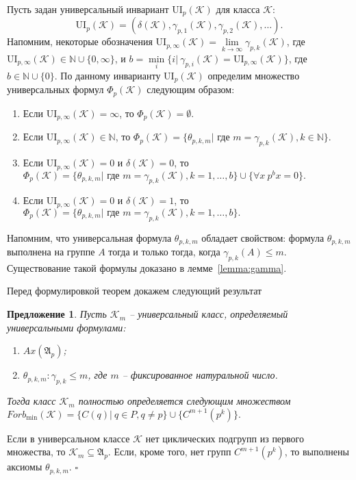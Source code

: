 \documentclass[a4paper,11pt,twoside]{article}
\newtheorem{proposition}{Предложение}[section]
\def\proof{{\noindent{\bf Доказательство.}} }
\def\A{{\mathfrak{A}}}
\def\K{{\mathcal{K}}}
\def\N{{\mathbb{N}}}
\def\ui{{\mathrm{UI}}}
\begin{document}
Пусть задан универсальный инвариант $\ui_p(\K)$ для класса $\K$:
$$\ui_p(\K) = (\delta(\K), \gamma_{p,1}(\K), \gamma_{p,2}(\K), \ldots).$$ 
Напомним, некоторые обозначения $\ui_{p,\infty}(\K) = \lim\limits_{k \rightarrow \infty} \gamma_{p,k}(\K)$, где $\ui_{p,\infty}(\K) \in \N \cup \{0, \infty\}$, и $b = \min\limits_{i}\{i | \ \gamma_{p,i}(\K) = \ui_{p, \infty}(\K)\}$, где $b \in \N \cup \{0\}$. По данному инварианту $\ui_p(\K)$ определим множество универсальных формул $\Phi_p(\K)$ следующим образом:
\begin{enumerate}
\item Если $\ui_{p,\infty}(\K) = \infty$, то $\Phi_p(\K) = \emptyset.$
\item Если $\ui_{p, \infty}(\K) \in \N$, то $\Phi_p(\K) = \{\theta_{p,k,m} | \text{ где } m = \gamma_{p,k}(\K), k \in \N\}.$
\item Если $\ui_{p, \infty}(\K) = 0$ и $\delta(\K) = 0$, то $\Phi_p(\K) = \{\theta_{p,k,m} | \text{ где } m = \gamma_{p,k}(\K), k = 1,\ldots,b\} \cup \{\forall x \ p^b x = 0\}.$
\item Если $\ui_{p, \infty}(\K) = 0$ и $\delta(\K) = 1$, то $\Phi_p(\K) = \{\theta_{p,k,m} | \text{ где } m = \gamma_{p,k}(\K), k = 1, \ldots, b\}.$
\end{enumerate}
Напомним, что универсальная формула $\theta_{p,k,m}$ обладает свойством: формула $\theta_{p,k,m}$ выполнена на группе $A$ тогда и только тогда, когда $\gamma_{p,k}(A) \leq m$. Существование такой формулы доказано в лемме~\ref{lemma:gamma}.

Перед формулировкой теорем докажем следующий результат

\begin{proposition}
Пусть $\K_m$ -- универсальный класс, определяемый универсальными формулами:
\begin{enumerate}
\item $Ax(\A_p)$;
\item $\theta_{p,k,m} : \gamma_{p,k} \leq m$, где $m$ -- фиксированное натуральной число.
\end{enumerate}
Тогда класс $\K_m$ полностью определяется следующим множеством $Forb_{\min} (\K) = \{C(q) | \ q \in P, q \neq p\} \cup \{ C^{m+1}(p^k)\}.$
\end{proposition}

\proof Если в универсальном классе $\K$ нет циклических подгрупп из первого множества, то $\K_m \subseteq \A_p$. Если, кроме того, нет групп $C^{m+1}(p^k)$, то выполнены аксиомы $\theta_{p,k,m}$. $\square$
\end{document}
